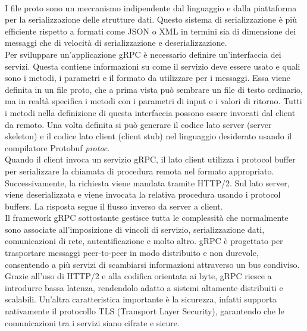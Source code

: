 \\I file proto sono un meccanismo indipendente dal linguaggio e dalla piattaforma per la serializzazione delle strutture dati. Questo sistema di serializzazione è più efficiente rispetto a formati come JSON o XML
in termini sia di dimensione dei messaggi che di velocità di serializzazione e deserializzazione.
\\Per sviluppare un'applicazione gRPC è necessario definire un'interfaccia dei servizi. Questa contiene informazioni su come il servizio deve essere usato e quali sono i metodi, i parametri e 
il formato da utilizzare per i messaggi. Essa viene definita in un file proto, che a prima vista può sembrare un file di testo ordinario, ma in realtà specifica i metodi con i parametri di input e i valori di ritorno.
Tutti i metodi nella definizione di questa interfaccia possono essere invocati dal client da remoto.
Una volta definita si può generare il codice lato server (server skeleton) e il codice lato client (client stub) nel linguaggio desiderato usando il compilatore Protobuf \textit{protoc}\cite{librogrpc}.
\\Quando il client invoca un servizio gRPC, il lato client utilizza i protocol buffer per serializzare la chiamata di procedura remota nel formato appropriato. 
Successivamente, la richiesta viene mandata tramite HTTP/2. Sul lato server, viene deserializzata e viene invocata la relativa procedura usando i protocol buffers.
La risposta segue il flusso inverso da server a client\cite{librogrpc}.
\\Il framework gRPC sottostante gestisce tutta le complessità che normalmente sono associate all'imposizione di vincoli di servizio, serializzazione dati, comunicazioni di rete, autentificazione e molto altro.
gRPC è progettato per trasportare messaggi peer-to-peer in modo distribuito e non durevole, consentendo a più servizi di scambiarsi informazioni attraverso un bus condiviso.
Grazie all'uso di HTTP/2 e alla codifica orientata ai byte, gRPC riesce a introdurre bassa latenza, rendendolo adatto a sistemi altamente distribuiti e scalabili. 
Un'altra caratteristica importante è la sicurezza, infatti supporta nativamente il protocollo TLS (Transport Layer Security), garantendo che le comunicazioni tra i servizi siano cifrate e sicure.



